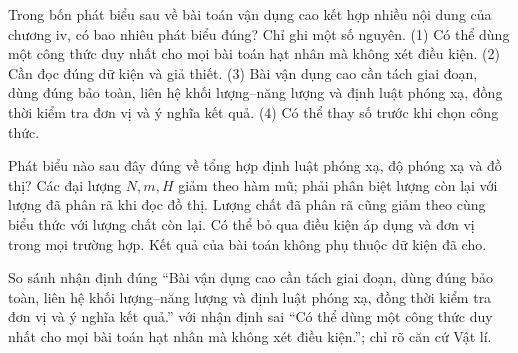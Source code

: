 \begin{ex}
Trong bốn phát biểu sau về bài toán vận dụng cao kết hợp nhiều nội dung của chương iv, có bao nhiêu phát biểu đúng? Chỉ ghi một số nguyên. (1) Có thể dùng một công thức duy nhất cho mọi bài toán hạt nhân mà không xét điều kiện. (2) Cần đọc đúng dữ kiện và giả thiết. (3) Bài vận dụng cao cần tách giai đoạn, dùng đúng bảo toàn, liên hệ khối lượng–năng lượng và định luật phóng xạ, đồng thời kiểm tra đơn vị và ý nghĩa kết quả. (4) Có thể thay số trước khi chọn công thức.
\end{ex}

\begin{ex}
Phát biểu nào sau đây đúng về tổng hợp định luật phóng xạ, độ phóng xạ và đồ thị?
\choice
{\True Các đại lượng $N,m,H$ giảm theo hàm mũ; phải phân biệt lượng còn lại với lượng đã phân rã khi đọc đồ thị.}
{Lượng chất đã phân rã cũng giảm theo cùng biểu thức với lượng chất còn lại.}
{Có thể bỏ qua điều kiện áp dụng và đơn vị trong mọi trường hợp.}
{Kết quả của bài toán không phụ thuộc dữ kiện đã cho.}
\end{ex}

\begin{bt}
So sánh nhận định đúng “Bài vận dụng cao cần tách giai đoạn, dùng đúng bảo toàn, liên hệ khối lượng–năng lượng và định luật phóng xạ, đồng thời kiểm tra đơn vị và ý nghĩa kết quả.” với nhận định sai “Có thể dùng một công thức duy nhất cho mọi bài toán hạt nhân mà không xét điều kiện.”; chỉ rõ căn cứ Vật lí.
\end{bt}

